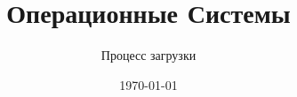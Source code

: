 \documentclass[12pt,t]{beamer}
\title{Операционные Системы}
\subtitle{Процесс загрузки}
\date{\today}
\begin{document}
  \begin{frame}
    \titlepage
  \end{frame}
  
\end{document}
